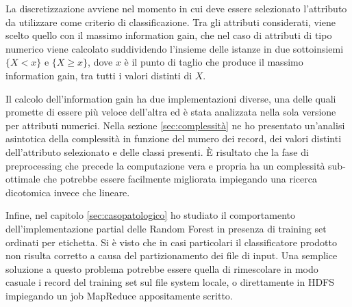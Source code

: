 \documentclass[a4paper,11pt,twoside,openright,fleqn]{book}
\begin{document}
La discretizzazione avviene nel momento in cui deve essere selezionato l'attributo da utilizzare come criterio di classificazione. Tra gli attributi considerati, viene scelto quello con il massimo information gain, che nel caso di attributi di tipo numerico viene calcolato suddividendo l'insieme delle istanze in due sottoinsiemi $\{X < x\}$ e $\{X \geq x\}$, dove $x$ è il punto di taglio che produce il massimo information gain, tra tutti i valori distinti di $X$.

Il calcolo dell'information gain ha due implementazioni diverse, una delle quali promette di essere più veloce dell'altra ed è stata analizzata nella sola versione per attributi numerici. Nella sezione \ref{sec:complessità} ne ho presentato un'analisi asintotica della complessità in funzione del numero dei record, dei valori distinti dell'attributo selezionato e delle classi presenti. È risultato che la fase di preprocessing che precede la computazione vera e propria ha un complessità sub-ottimale che potrebbe essere facilmente migliorata impiegando una ricerca dicotomica invece che lineare.

Infine, nel capitolo \ref{sec:casopatologico} ho studiato il comportamento dell'implementazione partial delle Random Forest in presenza di training set ordinati per etichetta. Si è visto che in casi particolari il classificatore prodotto non risulta corretto a causa del partizionamento dei file di input. Una semplice soluzione a questo problema potrebbe essere quella di rimescolare in modo casuale i record del training set sul file system locale, o direttamente in HDFS impiegando un job MapReduce appositamente scritto.

\makeatletter\@openrightfalse\makeatother

\lstlistoflistings

\printbibliography
\end{document}
